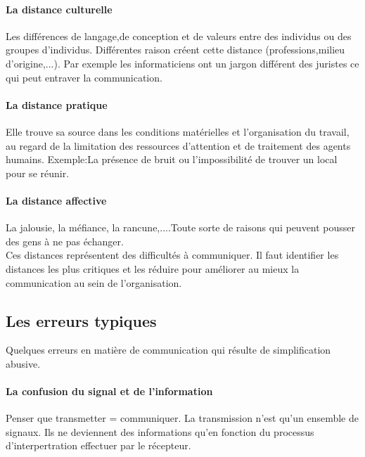 \documentclass[11pt]{article} %
\begin{document}
		\paragraph{La distance culturelle} Les différences de langage,de conception et de valeurs entre des 	
		individus ou des groupes d'individus. Différentes raison créent cette distance (professions,milieu 
		d'origine,...). Par exemple les informaticiens ont un jargon différent des juristes ce qui peut entraver la 
		communication.
		\paragraph{La distance pratique} Elle trouve sa source dans les conditions matérielles et l'organisation
		du travail, au regard de la limitation des ressources d'attention et de traitement des agents humains. 
		Exemple:La présence de bruit ou l'impossibilité de trouver un local pour se réunir.
		\paragraph{La distance affective} La jalousie, la méfiance, la rancune,....Toute sorte de raisons qui 
		peuvent pousser des gens à ne pas échanger.\\
		Ces distances représentent des difficultés à communiquer. Il faut identifier les distances les plus 
		critiques et les réduire pour améliorer au mieux la communication au sein de l'organisation.


	\subsection{Les erreurs typiques}
		Quelques erreurs en matière de communication qui résulte de simplification abusive.
		\paragraph{La confusion du signal et de l'information} Penser que transmetter = communiquer.  La transmission n'est qu'un ensemble de signaux. Ils ne deviennent des informations qu'en fonction du processus d'interpertration effectuer par 
		le récepteur.
\end{document}
